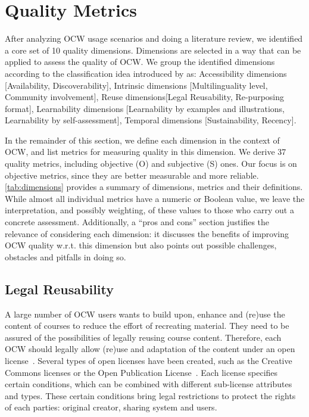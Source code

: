 \documentclass{sig-alternate}
\theoremstyle{definition}
\begin{document}
\noindent\section{Quality Metrics}
\label{sec:metric-def}


After analyzing OCW usage scenarios and doing a literature review, we identified a core set of 10 quality dimensions.
Dimensions are selected in a way that can be applied to assess the quality of OCW.
We group the identified dimensions according to the classification idea introduced by \citeauthor{Zaveri2012:LODQ} \parencite*{Zaveri2012:LODQ} as:
Accessibility dimensions [Availability, Discoverability], Intrinsic dimensions [Multilinguality level, Community involvement], Reuse dimensions[Legal Reusability, Re-purposing format], Learnability dimensions [Learnability by examples and illustrations, Learnability by self-assessment], 
Temporal dimensions [Sustainability, Recency].

In the remainder of this section, we define each dimension in the context of OCW, and list metrics for measuring quality in this dimension.
We derive 37 quality metrics, including objective (O) and subjective (S) ones.
Our focus is on objective metrics, since they are better measurable and more reliable.
\autoref{tab:dimensions} provides a summary of dimensions, metrics and their definitions.
While almost all individual metrics have a numeric or Boolean value, we leave the interpretation, and possibly weighting, of these values to those who carry out a concrete assessment.
Additionally, a ``pros and cons'' section justifies the relevance of considering each dimension: it discusses the benefits of improving OCW quality w.r.t. this dimension but also points out possible challenges, obstacles and pitfalls in doing so.

\subsection{Legal Reusability}
\label{sec:Legal}
A large number of OCW users wants to build upon, enhance and (re)use the content of courses to reduce the effort of recreating material.
They need to be assured of the possibilities of legally reusing course content.
Therefore, each OCW should legally allow (re)use and adaptation of the content under an open license~\parencite{Friesen.2013}.
Several types of open licenses have been created, such as the Creative Commons licenses or the Open Publication License~\parencite{Atkins.2007}.
Each license specifies certain conditions, which can be combined with different sub-license attributes and types.
These certain conditions bring legal restrictions to protect the rights of each parties: original creator, sharing system and users.
\end{document}

